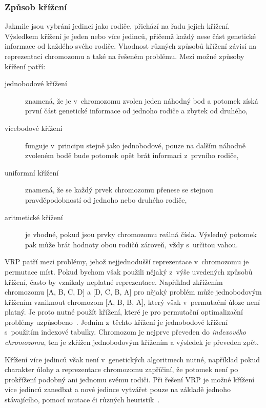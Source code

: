\documentclass[a4paper]{article}
\begin{document}
\subsubsection{Způsob křížení}
Jakmile jsou vybráni jedinci jako rodiče, přichází na řadu jejich křížení. Vý\-sled\-kem křížení je jeden nebo více jedinců, přičemž každý nese část genetické informace od každého svého rodiče. Vhodnost různých způsobů křížení závisí na reprezentaci chromozomu a také na řešeném problému. Mezi možné způsoby křížení patří:

\begin{description}
\item[jednobodové křížení] znamená, že je v~chromozomu zvolen jeden náhodný bod a potomek získá první část genetické informace od jednoho rodiče a zbytek od druhého,
\item[vícebodové křížení] funguje v~principu stejně jako jednobodové, pouze na dalším náhodně zvoleném bodě bude potomek opět brát informaci z~prv\-ní\-ho rodiče,
\item[uniformní křížení] znamená, že se každý prvek chromozomu přenese se stejnou pravděpodobností od jednoho nebo druhého rodiče,
\item[aritmetické křížení] je vhodné, pokud jsou prvky chromozomu reálná čísla. Výsledný potomek pak může brát hodnoty obou rodičů zároveň, vždy s~ur\-či\-tou vahou.
\end{description}

VRP patří mezi problémy, jehož nejjednodušší reprezentace v~chromozomu je permutace míst. Pokud bychom však použili nějaký z~výše uvedených způsobů křížení, často by vznikaly neplatné reprezentace. Například zkřížením chromozomu [A, B, C, D] a [D, C, B, A] pro nějaký problém může jednobodovým křížením vzniknout chromozom [A, B, B, A], který však v~permutační úloze není platný. Je proto nutné použít křížení, které je pro permutační optimalizační problémy uzpůsobeno~\cite{sfc}. Jedním z~těchto křížení je jednobodové křížení s~použitím indexové tabulky. Chromozom je nejprve převeden do \emph{indexového chromozomu}, ten je zkřížen jednobodovým křížením a výsledek je převeden zpět.

Křížení více jedinců však není v~genetických algoritmech nutné, například pokud charakter úlohy a reprezentace chromozomu zapříčiní, že potomek není po prokřížení podobný ani jednomu svému rodiči. Při řešení VRP je možné křížení více jedinců zanedbat a nové jedince vytvářet pouze na základě jednoho stávajícího, pomocí mutace či různých heuristik~\cite{masum}.
\end{document}
